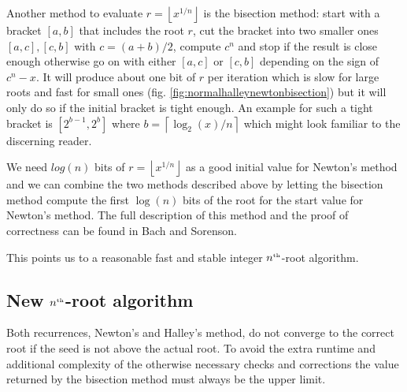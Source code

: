 \documentclass[a4paper,10pt]{report}
\providecommand{\floor}[1]{\left\lfloor#1\right\rfloor}
\providecommand{\ceil}[1]{\left\lceil#1\right\rceil}
\newcommand{\nthroot}{$n^{\text{\tiny th}}$-root}
\theoremstyle{plain} %
\theoremstyle{definition}
\theoremstyle{remark}
\begin{document}
\begin{center}

\end{center}

Another method to evaluate $r = \floor{x^{1/n}}$ is the bisection method: start with a bracket $[a,b]$ that includes the root $r$, cut the bracket into two smaller ones $[a,c], [c,b]$ with $c = (a+b)/2$, compute $c^n$ and stop if the result is close enough otherwise go on with either $[a,c]$ or $[c,b]$ depending on the sign of $c^n - x$. It will produce about one bit of $r$ per iteration which is slow for large roots and fast for small ones (fig. \ref{fig:normalhalleynewtonbisection}) but it will only do so if the initial bracket is tight enough. An example for such a tight bracket is $[2^{b-1}, 2^b]$ where $b = \ceil{\log_2(x)/n}$ which might look familiar to the discerning reader.

We need $log(n)$ bits of $r = \floor{x^{1/n}}$ as a good initial value for Newton's method and we can combine the two methods described above by letting the bisection method compute the first $\log(n)$ bits of the root for the start value for Newton's method. The full description of this method and the proof of correctness can be found in Bach and Sorenson\cite{bach1993sieve}.

This points us to a reasonable fast and stable integer \nthroot{} algorithm.

\subsection{New \nthroot{} algorithm}
Both recurrences, Newton's and Halley's method, do not converge to the correct root if the seed is not above the actual root. To avoid the extra runtime and additional complexity of the otherwise necessary checks and corrections the value returned by the bisection method must always be the upper limit.
\end{document}

